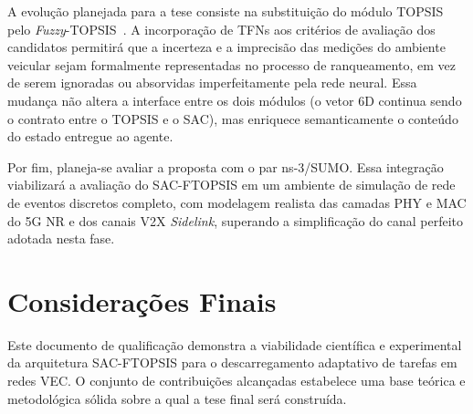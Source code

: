 A evolução planejada para a tese consiste na substituição do módulo \gls{TOPSIS} pelo \textit{Fuzzy}-\gls{TOPSIS}~\cite{chen2000}. A incorporação de \glspl{TFN} aos critérios de avaliação dos candidatos permitirá que a incerteza e a imprecisão das medições do ambiente veicular sejam formalmente representadas no processo de ranqueamento, em vez de serem ignoradas ou absorvidas imperfeitamente pela rede neural. Essa mudança não altera a interface entre os dois módulos (o vetor 6D continua sendo o contrato entre o \gls{TOPSIS} e o \gls{SAC}), mas enriquece semanticamente o conteúdo do estado entregue ao agente.

Por fim, planeja-se avaliar a proposta com o par ns-3/SUMO. Essa integração viabilizará a avaliação do \gls{SAC}-FTOPSIS em um ambiente de simulação de rede de eventos discretos completo, com modelagem realista das camadas \gls{PHY} e \gls{MAC} do \gls{5G} \gls{NR} e dos canais \gls{V2X} \textit{Sidelink}, superando a simplificação do canal perfeito adotada nesta fase.



\section{Considerações Finais}
\label{sec:consideracoes-finais}

Este documento de qualificação demonstra a viabilidade científica e experimental da arquitetura \gls{SAC}-FTOPSIS para o descarregamento adaptativo de tarefas em redes \gls{VEC}. O conjunto de contribuições alcançadas estabelece uma base teórica e metodológica sólida sobre a qual a tese final será construída.

